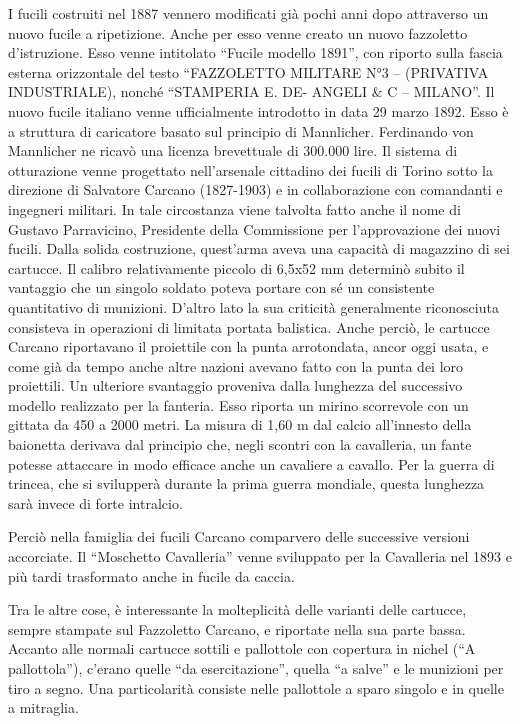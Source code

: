 I fucili costruiti nel 1887 vennero modificati già pochi anni dopo
attraverso un nuovo fucile a ripetizione. Anche per esso venne creato un
nuovo fazzoletto d'istruzione. Esso venne intitolato ``Fucile modello
1891'', con riporto sulla fascia esterna orizzontale del testo
``FAZZOLETTO MILITARE N°3 -- (PRIVATIVA INDUSTRIALE), nonché ``STAMPERIA
E. DE- ANGELI \& C -- MILANO''. Il nuovo fucile italiano venne
ufficialmente introdotto in data 29 marzo 1892. Esso è a struttura di
caricatore basato sul principio di Mannlicher. Ferdinando von Mannlicher
ne ricavò una licenza brevettuale di 300.000 lire. Il sistema di
otturazione venne progettato nell'arsenale cittadino dei fucili di
Torino sotto la direzione di Salvatore Carcano (1827-1903) e in
collaborazione con comandanti e ingegneri militari. In tale circostanza
viene talvolta fatto anche il nome di Gustavo Parravicino, Presidente
della Commissione per l'approvazione dei nuovi fucili. Dalla solida
costruzione, quest'arma aveva una capacità di magazzino di sei cartucce.
Il calibro relativamente piccolo di 6,5x52 mm determinò subito il
vantaggio che un singolo soldato poteva portare con sé un consistente
quantitativo di munizioni. D'altro lato la sua criticità generalmente
riconosciuta consisteva in operazioni di limitata portata balistica.
Anche perciò, le cartucce Carcano riportavano il proiettile con la punta
arrotondata, ancor oggi usata, e come già da tempo anche altre nazioni
avevano fatto con la punta dei loro proiettili. Un ulteriore svantaggio
proveniva dalla lunghezza del successivo modello realizzato per la
fanteria. Esso riporta un mirino scorrevole con un gittata da 450 a 2000
metri. La misura di 1,60 m dal calcio all'innesto della baionetta
derivava dal principio che, negli scontri con la cavalleria, un fante
potesse attaccare in modo efficace anche un cavaliere a cavallo. Per la
guerra di trincea, che si svilupperà durante la prima guerra mondiale,
questa lunghezza sarà invece di forte intralcio.

Perciò nella famiglia dei fucili Carcano comparvero delle successive
versioni accorciate. Il ``Moschetto Cavalleria'' venne sviluppato per la
Cavalleria nel 1893 e più tardi trasformato anche in fucile da caccia.

Tra le altre cose, è interessante la molteplicità delle varianti delle
cartucce, sempre stampate sul Fazzoletto Carcano, e riportate nella sua
parte bassa. Accanto alle normali cartucce sottili e pallottole con
copertura in nichel (``A pallottola''), c'erano quelle ``da
esercitazione'', quella ``a salve'' e le munizioni per tiro a segno. Una
particolarità consiste nelle pallottole a sparo singolo e in quelle a
mitraglia.

